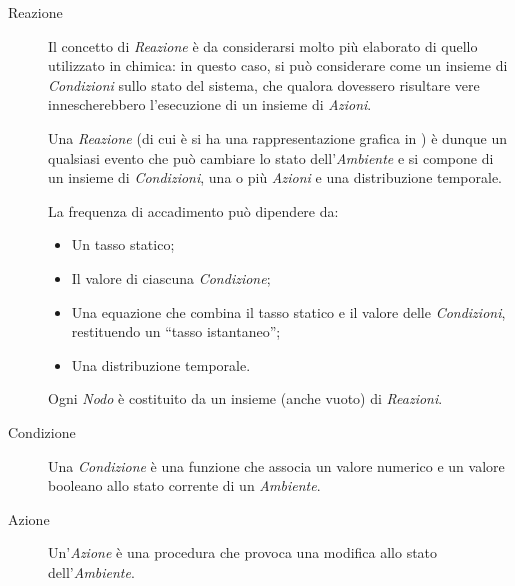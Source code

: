 \begin{description}
\begin{figure}[htbp]
{              %
          }%
          \label{fig:alchemist:reaction}
        \end{figure}

      \item[Reazione]\label{itm:react}
        Il concetto di \emph{Reazione} è da considerarsi molto più elaborato di quello utilizzato in chimica:
        in questo caso, si può considerare come un insieme di \emph{Condizioni} sullo stato del sistema, che qualora dovessero risultare vere innescherebbero l'esecuzione di un insieme di \emph{Azioni}.

        Una \emph{Reazione} (di cui è si ha una rappresentazione grafica in ) è dunque un qualsiasi evento che può cambiare lo stato dell'\emph{Ambiente} e si compone di un insieme di \emph{Condizioni}, una o più \emph{Azioni} e una distribuzione temporale.

        La frequenza di accadimento può dipendere da:
        \begin{itemize}
            \item Un tasso statico;
            \item Il valore di ciascuna \emph{Condizione};
            \item Una equazione che combina il tasso statico e il valore delle \emph{Condizioni}, restituendo un ``tasso istantaneo'';
            \item Una distribuzione temporale.
        \end{itemize}

        Ogni \emph{Nodo} è costituito da un insieme (anche vuoto) di \emph{Reazioni}.

      \item[Condizione]\label{itm:cond}
        Una \emph{Condizione} è una funzione che associa un valore numerico e un valore booleano allo stato corrente di un \emph{Ambiente}.

      \item[Azione]\label{itm:act}
        Un'\emph{Azione} è una procedura che provoca una modifica allo stato dell'\emph{Ambiente}.

      \end{description}

